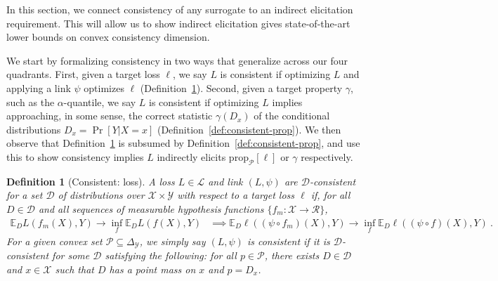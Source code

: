 \documentclass{article} %
\newcommand{\Comments}{0}
\newcommand{\mynote}[2]{\ifnum\Comments=1\textcolor{#1}{#2}\fi}
\newcommand{\mytodo}[2]{\ifnum\Comments=1%
	\todo[linecolor=#1!80!black,backgroundcolor=#1,bordercolor=#1!80!black]{#2}\fi}
\newcommand{\raft}[1]{\mytodo{green!20!white}{RF: #1}}
\newcommand{\jessie}[1]{\mynote{teal}{[JF: #1]}}
\newcommand{\simplex}{\Delta_\Y}
\newcommand{\prop}[2][\mathcal{P}]{\mathrm{prop}_{#1}[#2]}
\newcommand{\D}{\mathcal{D}}
\newcommand{\E}{\mathbb{E}}
\renewcommand{\L}{\mathcal{L}}
\newcommand{\R}{\mathcal{R}}
\renewcommand{\P}{\mathcal{P}}
\newcommand{\X}{\mathcal{X}}
\newcommand{\Y}{\mathcal{Y}}
\newtheorem{definition}{Definition}
\begin{document}
In this section, we connect consistency of any surrogate to an indirect elicitation requirement.
This will allow us to show indirect elicitation gives state-of-the-art lower bounds on convex consistency dimension.

We start by formalizing consistency in two ways that generalize across our four quadrants.
First, given a target loss $\ell$, we say $L$ is consistent if optimizing $L$ and applying a link $\psi$ optimizes $\ell$ (Definition~\ref{def:consistent-ell}).
Second, given a target property $\gamma$, such as the $\alpha$-quantile, we say $L$ is consistent if optimizing $L$ implies approaching, in some sense, the correct statistic $\gamma(D_x)$ of the conditional distributions $D_x = \Pr[Y|X=x]$ (Definition~\ref{def:consistent-prop}).
We then observe that Definition~\ref{def:consistent-ell} is subsumed by Definition~\ref{def:consistent-prop}, and use this to show consistency implies $L$ indirectly elicits $\prop{\ell}$ or $\gamma$ respectively.

\begin{definition}[Consistent: loss]\label{def:consistent-ell}
	A loss $L \in \L$ and link $(L,\psi)$ are \emph{$\D$-consistent} for a set $\D$ of distributions over $\X \times \Y$ with respect to a target loss $\ell$ if, for all $D \in \D$ and all sequences of measurable hypothesis functions $\{f_m : \X \to \R\}$,
	\begin{align*}
	\E_D L(f_m(X), Y) \to \inf_f \E_D L(f(X), Y) &\implies \E_D \ell((\psi \circ f_m)(X), Y) \to \inf_f \E_D \ell((\psi \circ f)(X), Y)~.~
	\end{align*}
	For a given convex set $\P \subseteq \simplex$, we simply say $(L,\psi)$ is \emph{consistent} if it is $\D$-consistent for some $\D$ satisfying the following: for all $p \in \P$, there exists $D \in \D$ and $x \in \X$ such that $D$ has a point mass on $x$ and $p = D_x$.
\end{definition}
\end{document}
